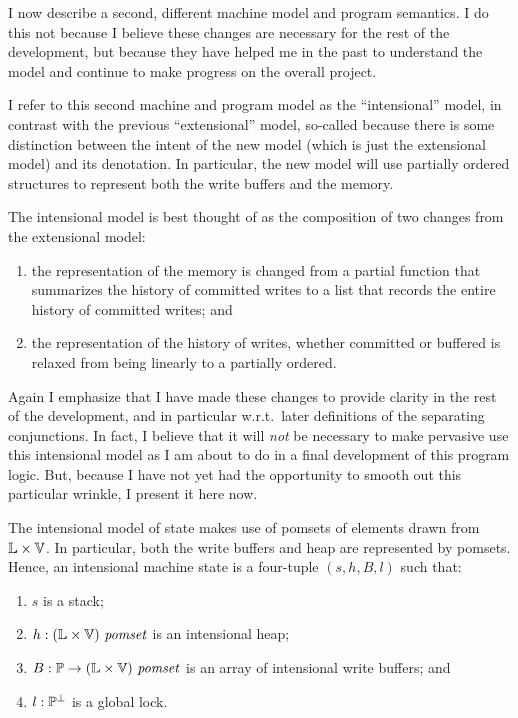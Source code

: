 \documentclass[11pt]{article}
\begin{document}
I now describe a second, different machine model and program semantics. I do this not because I believe these changes are necessary for the rest of the development, but because they have helped me in the past to understand the model and continue to make progress on the overall project. 

I refer to this second machine and program model as the ``intensional'' model, in contrast with the previous ``extensional'' model, so-called because there is some distinction between the intent of the new model (which is just the extensional model) and its denotation. In particular, the new model will use partially ordered structures to represent both the write buffers and the memory. 

The intensional model is best thought of as the composition of two changes from the extensional model: \begin{enumerate}
	\item the representation of the memory is changed from a partial function that summarizes the history of committed writes to a list that records the entire history of committed writes; and
	\item the representation of the history of writes, whether committed or buffered is relaxed from being linearly to a partially ordered. 
\end{enumerate} 

Again I emphasize that I have made these changes to provide clarity in the rest of the development, and in particular w.r.t.~later definitions of the separating conjunctions. In fact, I believe that it will \emph{not} be necessary to make pervasive use this intensional model as I am about to do in a final development of this program logic. But, because I have not yet had the opportunity to smooth out this particular wrinkle, I present it here now. 

The intensional model of state makes use of pomsets of elements drawn from $\mathbb{L} \times \mathbb{V}$. In particular, both the write buffers and heap are represented by pomsets. Hence, an intensional machine state is a four-tuple $(s,h,B,l)$ such that: \begin{enumerate}
	\item $s$ is a stack; 
	\item $h : (\mathbb{L} \times \mathbb{V})~\mathit{pomset}$ is an intensional heap;
	\item $B : \mathbb{P} \rightarrow (\mathbb{L} \times \mathbb{V})~\mathit{pomset}$ is an array of intensional write buffers; and 
	\item $l : \mathbb{P}^\bot$ is a global lock.
\end{enumerate}
\end{document}
